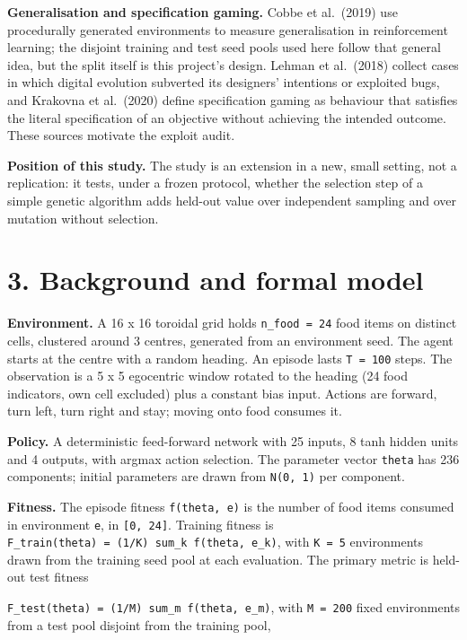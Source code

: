 \documentclass[
]{article}
\begin{document}
\textbf{Generalisation and specification gaming.} Cobbe et al.~(2019)
use procedurally generated environments to measure generalisation in
reinforcement learning; the disjoint training and test seed pools used
here follow that general idea, but the split itself is this project's
design. Lehman et al.~(2018) collect cases in which digital evolution
subverted its designers' intentions or exploited bugs, and Krakovna et
al.~(2020) define specification gaming as behaviour that satisfies the
literal specification of an objective without achieving the intended
outcome. These sources motivate the exploit audit.

\textbf{Position of this study.} The study is an extension in a new,
small setting, not a replication: it tests, under a frozen protocol,
whether the selection step of a simple genetic algorithm adds held-out
value over independent sampling and over mutation without selection.

\section{3. Background and formal
model}\label{background-and-formal-model}

\textbf{Environment.} A 16 x 16 toroidal grid holds
\texttt{n\_food\ =\ 24} food items on distinct cells, clustered around 3
centres, generated from an environment seed. The agent starts at the
centre with a random heading. An episode lasts \texttt{T\ =\ 100} steps.
The observation is a 5 x 5 egocentric window rotated to the heading (24
food indicators, own cell excluded) plus a constant bias input. Actions
are forward, turn left, turn right and stay; moving onto food consumes
it.

\textbf{Policy.} A deterministic feed-forward network with 25 inputs, 8
tanh hidden units and 4 outputs, with argmax action selection. The
parameter vector \texttt{theta} has 236 components; initial parameters
are drawn from \texttt{N(0,\ 1)} per component.

\textbf{Fitness.} The episode fitness \texttt{f(theta,\ e)} is the
number of food items consumed in environment \texttt{e}, in
\texttt{{[}0,\ 24{]}}. Training fitness is
\texttt{F\_train(theta)\ =\ (1/K)\ sum\_k\ f(theta,\ e\_k)}, with
\texttt{K\ =\ 5} environments drawn from the training seed pool at each
evaluation. The primary metric is held-out test fitness

\texttt{F\_test(theta)\ =\ (1/M)\ sum\_m\ f(theta,\ e\_m)}, with
\texttt{M\ =\ 200} fixed environments from a test pool disjoint from the
training pool,
\end{document}
